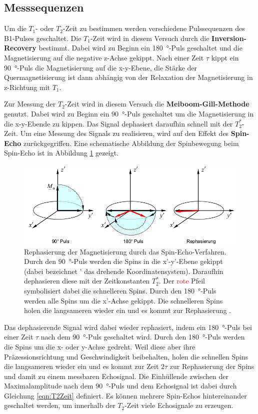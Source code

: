 
\subsection{Messsequenzen}

Um die $T_1$- oder $T_2$-Zeit zu bestimmen werden verschiedene Pulssequenzen des B1-Pulses geschaltet.
Die $T_1$-Zeit wird in diesem Versuch durch die \textbf{Inversion-Recovery} bestimmt.
Dabei wird zu Beginn ein \SI{180}{\degree}-Puls geschaltet und die Magnetisierung auf die negative z-Achse gekippt.
Nach einer Zeit $\tau$ kippt ein \SI{90}{\degree}-Puls die Magnetisierung auf die x-y-Ebene, die Stärke der Quermagnetisierung ist dann abhängig von der Relaxation der Magnetisierung in z-Richtung mit $T_1$.

Zur Messung der $T_2$-Zeit wird in diesem Versuch die \textbf{Meiboom-Gill-Methode} genutzt.
Dabei wird zu Beginn ein \SI{90}{\degree}-Puls geschaltet um die Magnetisierung in die x-y-Ebende zu kippen.
Das Signal dephasiert daraufhin schnell mit der $T_2^*$-Zeit.
Um eine Messung des Signals zu realisieren, wird auf den Effekt des \textbf{Spin-Echo} zurückgegriffen.
Eine schematische Abbildung der Spinbewegung beim Spin-Echo ist in Abbildung \ref{fig:Spin-Echo} gezeigt.

\begin{figure}[H]
  \centering
  \includegraphics[width = .6\textwidth]{Spin-Echo.png}
  \caption{Rephasierung der Magnetisierung durch das Spin-Echo-Verfahren. Durch den \SI{90}{\degree}-Puls werden die Spins in die x'-y'-Ebene gekippt (dabei bezeichnet ' das drehende Koordinatensystem). Daraufhin dephasieren diese mit der Zeitkonstanten $T_2^*$. Der \textcolor{red}{rote} Pfeil symbolisiert dabei die schnelleren Spins. Durch den \SI{180}{\degree}-Puls werden alle Spins um die x'-Achse gekippt. Die schnelleren Spins holen die langsameren wieder ein und es kommt zur Rephasierung \cite{TOMO}.}
  \label{fig:Spin-Echo}
\end{figure}

Das dephasierende Signal wird dabei wieder rephasiert, indem ein \SI{180}{\degree}-Puls bei einer Zeit $\tau$ nach dem \SI{90}{\degree}-Puls geschaltet wird.
Durch den \SI{180}{\degree}-Puls werden die Spins um die x- oder y-Achse gedreht.
Weil diese aber ihre Präzessionsrichtung und Geschwindigkeit beibehalten, holen die schnellen Spins die langsameren wieder ein und es kommt zur Zeit $2\tau$ zur Rephasierung der Spins und damit zu einem messbaren Echosignal.
Die Einhüllende zwischen der Maximalamplitude nach dem \SI{90}{\degree}-Puls und dem Echosignal ist dabei durch Gleichung \eqref{eqn:T2Zeit} definiert.
Es können mehrere Spin-Echos hintereinander geschaltet werden, um innerhalb der $T_2$-Zeit viele Echosignale zu erzeugen.

